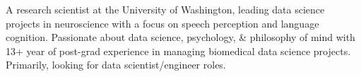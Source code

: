 

\begin{cvparagraph}

 A research scientist at the University of Washington, leading data science projects in neuroscience with a focus on speech perception and language cognition. Passionate about data science, psychology, \& philosophy of mind with 13+ year of post-grad experience in managing biomedical data science projects. Primarily, looking for data scientist/engineer roles.
\end{cvparagraph}
